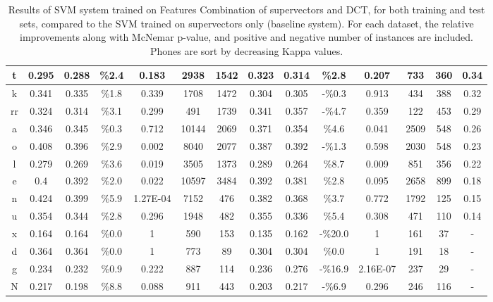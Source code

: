 \begin{table}[H]
{\begin{tabular}{|c| |c|c|c|c|c|c| |c|c|c|c|c|c| |c|}
t & 0.295 & 0.288 & \%2.4 & 0.183 & 2938 & 1542 & 0.323 & 0.314 & \%2.8 & 0.207 & 733 & 360 & 0.34 \\ \hline
k & 0.341 & 0.335 & \%1.8 & 0.339 & 1708 & 1472 & 0.304 & 0.305 & -\%0.3 & 0.913 & 434 & 388 & 0.32 \\ \hline
rr & 0.324 & 0.314 & \%3.1 & 0.299 & 491 & 1739 & 0.341 & 0.357 & -\%4.7 & 0.359 & 122 & 453 & 0.29 \\ \hline
a & 0.346 & 0.345 & \%0.3 & 0.712 & 10144 & 2069 & 0.371 & 0.354 & \%4.6 & 0.041 & 2509 & 548 & 0.26 \\ \hline
\rowcolor{lightgray} o & 0.408 & 0.396 & \%2.9 & 0.002 & 8040 & 2077 & 0.387 & 0.392 & -\%1.3 & 0.598 & 2030 & 548 & 0.23 \\ \hline
\rowcolor{lightgray} l & 0.279 & 0.269 & \%3.6 & 0.019 & 3505 & 1373 & 0.289 & 0.264 & \%8.7 & 0.009 & 851 & 356 & 0.22 \\ \hline
\rowcolor{lightgray} e & 0.4 & 0.392 & \%2.0 & 0.022 & 10597 & 3484 & 0.392 & 0.381 & \%2.8 & 0.095 & 2658 & 899 & 0.18 \\ \hline
\rowcolor{lightgray} n & 0.424 & 0.399 & \%5.9 & 1.27E-04 & 7152 & 476 & 0.382 & 0.368 & \%3.7 & 0.772 & 1792 & 125 & 0.15 \\ \hline
u & 0.354 & 0.344 & \%2.8 & 0.296 & 1948 & 482 & 0.355 & 0.336 & \%5.4 & 0.308 & 471 & 110 & 0.14 \\ \hline
x & 0.164 & 0.164 & \%0.0 & 1 & 590 & 153 & 0.135 & 0.162 & -\%20.0 & 1 & 161 & 37 & - \\ \hline
d & 0.364 & 0.364 & \%0.0 & 1 & 773 & 89 & 0.304 & 0.304 & \%0.0 & 1 & 191 & 18 & - \\ \hline
g & 0.234 & 0.232 & \%0.9 & 0.222 & 887 & 114 & 0.236 & 0.276 & -\%16.9 & 2.16E-07 & 237 & 29 & - \\ \hline
N & 0.217 & 0.198 & \%8.8 & 0.088 & 911 & 443 & 0.203 & 0.217 & -\%6.9 & 0.296 & 246 & 116 & - \\ \hline

\end{tabular}

}
\caption{Results of SVM system trained on Features Combination of supervectors and DCT, 
for both training and test sets, compared to the SVM trained on supervectors 
only (baseline system).
For each dataset, the relative improvements along with McNemar p-value, and
positive and negative number of instances are included. Phones are sort by decreasing Kappa values.}
\label{tab:featuresCombinationAppendixTable}
\end{table}


